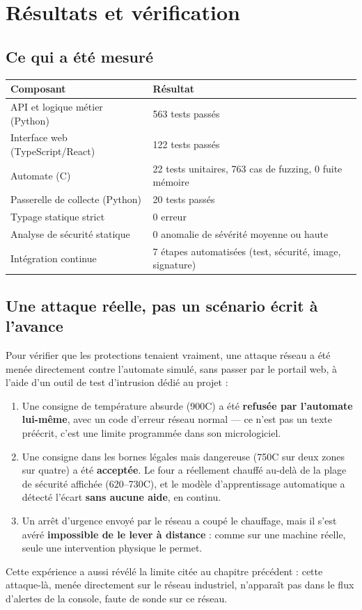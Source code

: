 \documentclass[11pt,a4paper]{report}
\begin{document}
\chapter{Résultats et vérification}
\label{chap:resultats}

\section{Ce qui a été mesuré}
\begin{center}
\begin{tabular}{@{}ll@{}}
\toprule
\textbf{Composant} & \textbf{Résultat} \\
\midrule
API et logique métier (Python) & 563 tests passés \\
Interface web (TypeScript/React) & 122 tests passés \\
Automate (C) & 22 tests unitaires, 763 cas de fuzzing, 0 fuite mémoire \\
Passerelle de collecte (Python) & 20 tests passés \\
Typage statique strict & 0 erreur \\
Analyse de sécurité statique & 0 anomalie de sévérité moyenne ou haute \\
Intégration continue & 7 étapes automatisées (test, sécurité, image, signature) \\
\bottomrule
\end{tabular}
\end{center}

\section{Une attaque réelle, pas un scénario écrit à l'avance}
Pour vérifier que les protections tenaient vraiment, une attaque réseau a été
menée directement contre l'automate simulé, sans passer par le portail web, à
l'aide d'un outil de test d'intrusion dédié au projet :
\begin{enumerate}
  \item Une consigne de température absurde (900\textdegree{}C) a été
    \textbf{refusée par l'automate lui-même}, avec un code d'erreur réseau
    normal — ce n'est pas un texte préécrit, c'est une limite programmée dans
    son micrologiciel.
  \item Une consigne dans les bornes légales mais dangereuse (750\textdegree{}C
    sur deux zones sur quatre) a été \textbf{acceptée}. Le four a réellement
    chauffé au-delà de la plage de sécurité affichée (620--730\textdegree{}C),
    et le modèle d'apprentissage automatique a détecté l'écart \textbf{sans
    aucune aide}, en continu.
  \item Un arrêt d'urgence envoyé par le réseau a coupé le chauffage, mais il
    s'est avéré \textbf{impossible de le lever à distance} : comme sur une
    machine réelle, seule une intervention physique le permet.
\end{enumerate}
Cette expérience a aussi révélé la limite citée au chapitre précédent : cette
attaque-là, menée directement sur le réseau industriel, n'apparaît pas dans le
flux d'alertes de la console, faute de sonde sur ce réseau.
\end{document}
